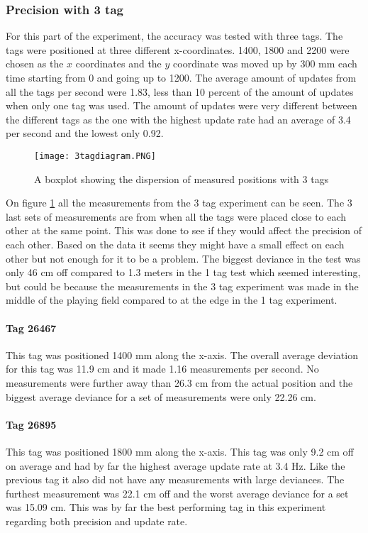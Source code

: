 \subsubsection{Precision with 3 tag}
For this part of the experiment, the accuracy was tested with three tags. 
The tags were positioned at three different x-coordinates. 
1400, 1800 and 2200 were chosen as the $x$ coordinates and the $y$ coordinate was moved up by 300 mm each time starting from 0 and going up to 1200.
The average amount of updates from all the tags per second were 1.83, less than 10 percent of the amount of updates when only one tag was used.
The amount of updates were very different between the different tags as the one with the highest update rate had an average of 3.4 per second and the lowest only 0.92.
\begin{figure}[H]
    \centering
    \texttt{[image: 3tagdiagram.PNG]}
    \caption{A boxplot showing the dispersion of measured positions with 3 tags}
    \label{fig:3tagdiagram}
\end{figure}
On figure \ref{fig:3tagdiagram} all the measurements from the 3 tag experiment can be seen.
The 3 last sets of measurements are from when all the tags were placed close to each other at the same point.
This was done to see if they would affect the precision of each other.
Based on the data it seems they might have a small effect on each other but not enough for it to be a problem.
The biggest deviance in the test was only 46 cm off compared to 1.3 meters in the 1 tag test which seemed interesting, but could be because the measurements in the 3 tag experiment was made in the middle of the playing field compared to at the edge in the 1 tag experiment.

\paragraph{Tag 26467}
This tag was positioned 1400 mm along the x-axis.
The overall average deviation for this tag was 11.9 cm and it made 1.16 measurements per second.
No measurements were further away than 26.3 cm from the actual position and the biggest average deviance for a set of measurements were only 22.26 cm.


\paragraph{Tag 26895}
This tag was positioned 1800 mm along the x-axis.
This tag was only 9.2 cm off on average and had by far the highest average update rate at 3.4 Hz.
Like the previous tag it also did not have any measurements with large deviances.
The furthest measurement was 22.1 cm off and the worst average deviance for a set was 15.09 cm.
This was by far the best performing tag in this experiment regarding both precision and update rate.

